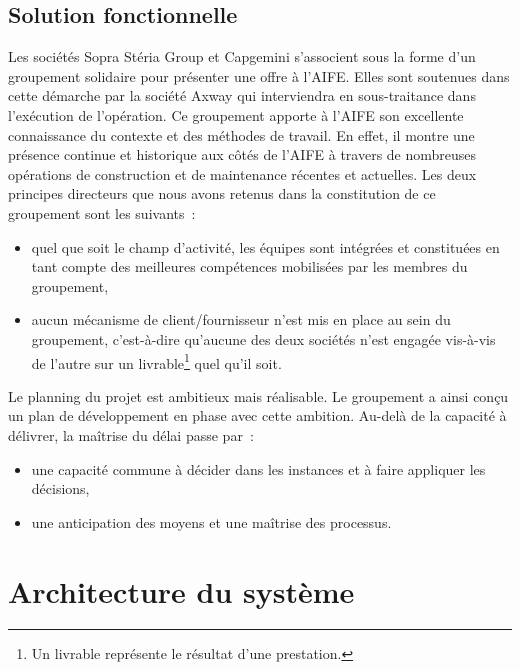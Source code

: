 \documentclass[12pt,a4paper]{article}
\begin{document}
\subsection{Solution fonctionnelle}
Les sociétés Sopra Stéria Group et Capgemini s’associent sous la forme d’un groupement solidaire pour présenter une offre à l’AIFE. Elles sont soutenues dans cette démarche par la société Axway qui interviendra en sous-traitance dans l’exécution de l’opération.
\smallbreak
Ce groupement apporte à l’AIFE son excellente connaissance du contexte et des méthodes de travail. En effet, il montre une présence continue et historique aux côtés de l’AIFE à travers de nombreuses opérations de construction et de maintenance récentes et actuelles.
\smallbreak
Les deux principes directeurs que nous avons retenus dans la constitution de ce groupement sont les suivants~:
\smallbreak
\begin{itemize}
\item quel que soit le champ d’activité, les équipes sont intégrées et constituées en tant compte des meilleures compétences mobilisées par les membres du groupement,
\item aucun mécanisme de client/fournisseur n’est mis en place au sein du groupement, c’est-à-dire qu’aucune des deux sociétés n’est engagée vis-à-vis de l’autre sur un livrable\footnote{Un livrable représente le résultat d'une prestation.} quel qu’il soit.
\end{itemize}
\medbreak
Le planning du projet est ambitieux mais réalisable. Le groupement a ainsi conçu un plan de développement en phase avec cette ambition. Au-delà de la capacité à délivrer, la maîtrise du délai passe par~:
\smallbreak
\begin{itemize}
\item une capacité commune à décider dans les instances et à faire appliquer les décisions,
\item une anticipation des moyens et une maîtrise des processus.
\end{itemize}
\smallbreak
\newpage
\clearpage
\section{Architecture du système}
\end{document}
